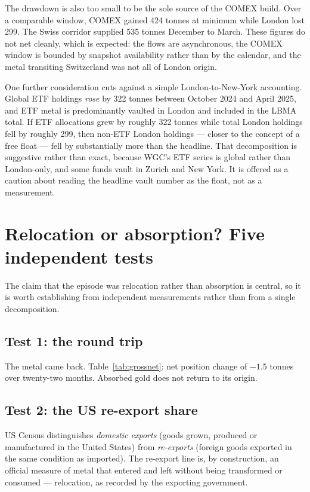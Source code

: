 \documentclass[11pt,a4paper]{article}
\begin{document}
The drawdown is also too small to be the sole source of the COMEX build. Over a comparable
window, COMEX gained 424 tonnes at minimum while London lost 299. The Swiss corridor supplied
535 tonnes December to March. These figures do not net cleanly, which is expected: the flows
are asynchronous, the COMEX window is bounded by snapshot availability rather than by the
calendar, and the metal transiting Switzerland was not all of London origin.

One further consideration cuts against a simple London-to-New-York accounting. Global ETF
holdings \emph{rose} by 322 tonnes between October 2024 and April 2025, and ETF metal is
predominantly vaulted in London and included in the LBMA total. If ETF allocations grew by
roughly 322 tonnes while total London holdings fell by roughly 299, then non-ETF London
holdings --- closer to the concept of a free float --- fell by substantially more than the
headline. That decomposition is suggestive rather than exact, because WGC's ETF series is
global rather than London-only, and some funds vault in Zurich and New York. It is offered as
a caution about reading the headline vault number as the float, not as a measurement.

\section{Relocation or absorption? Five independent tests}

The claim that the episode was relocation rather than absorption is central, so it is worth
establishing from independent measurements rather than from a single decomposition.

\subsection{Test 1: the round trip}

The metal came back. Table~\ref{tab:grossnet}: net position change of $-1.5$ tonnes over
twenty-two months. Absorbed gold does not return to its origin.

\subsection{Test 2: the US re-export share}

US Census distinguishes \emph{domestic exports} (goods grown, produced or manufactured in the
United States) from \emph{re-exports} (foreign goods exported in the same condition as
imported). The re-export line is, by construction, an official measure of metal that entered
and left without being transformed or consumed --- relocation, as recorded by the exporting
government.
\end{document}
